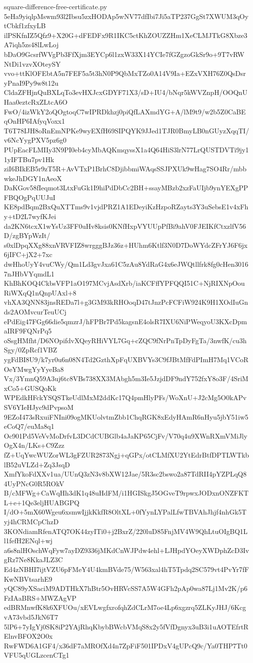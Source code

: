 \documentclass[11pt]{article}
\theoremstyle{definition}
\theoremstyle{remark}
\begin{document}
\begin{filecontents*}[overwrite]{square-difference-free-certificate.py}
5eHa9yiqlpMswm93l2Ibsu5zxHODAp5wNV77dfIbi7Ji5aTP237GgSt7XWUM3qOytCbkf1zfxyLB
ilPSKfnIZ5Qfz9+X20G+dFEDFx9R1IKC5ctKhZOUZZHm1XeCLMJTkG8Xbze3A7iqh5zs48lLwLoj
bDaO9GcsrfWVgPb3FfXjm3EYCp6l1zxW33X14YCIe7fGZgzoGkSr9o+9T7vRWNtDi1vzvXOteySY
vvo+ttKlOFEbtA5n7FEF5a5t3hN0P9QbMxTZo0A14V9Ia+EZxVXH76Z0QsDsryPnaI9Py9w8t12u
CldaZFHjnQuBXLqTo3evHXJcxGDYF71X3/sD+IU4/bNqr5kWVZnpH/OOQnUHaa0eztcRxZLtcA6O
FwO/4izWkY2oQOgtoqC7wIPRDkhzj0piQfLAXmdYG+A/lM9t9/w2b5Z0CaBEqOnHP6IAfyqVoxx1
T6T78IJH8oRnEmNPKe9wyEXfH69SIPQYK9JJed1TJR0BmyLB0nGUyzXqqTI/v6NcYygPXV5pz6g0
PUpEacFLMIIy3N9PI0eb4cyMbAQKmqyssX1a4Q64HiS3lrN77LrQUSTDVTi9jy11yIFTBu7pv1Hk
ziI6BIkEB5r9zT5R+AvVTxP1BrhC8DjibbmiWAqsSSJPXUk9wHag7SO4Rr/mbbwkeJhDGY1nAeoX
DaKGov58fIeqmot3LtxFuGk1I9hiPdDbCc2BH+ssayMBzb2xzFaUIjb9ynYEXgPPFBQOgPqUUJuI
KE8pdBqm2BxQuXTTms9v1vjdPRZ1A1EDeyiKzHzpoRZayts3Y3uSebsE1v4xFhy+tD2L7wyfKJei
da2KN6tcxX1wYsUz3FF0uHv8ksis0KNfHxpVYUUpPfBi9ahV0FJEIKfCtxzlfV56D/zgBYpWzIt/
s0xlDpqXXg88xnVRVFIZ8wrgggBJz36z+HUhm6Ktlf3N0D7DoWYdcZFrYJ6F6jx6jIFC+jX2+7xc
dwHhoUyY4vuCWy/Qm1Ld3gvJxa61C5zAu8YdRaG4x6eJWQtllfrk8fg0cHen30167nJHbVYqmdL1
KhBhKOQ4CkbsVFP1aO197MCvjAsdXrb/iaKCFffYPFQQI51C+NjRIXNpOouRiWXqQ1nQnpUAxl+8
vhXA3QNN83jnsREDa7l+g3GM93kRHOoqD47tJnzPcFCFiW924K9H1XOdIuGnds2AOMvcurTeuUCj
ePdEig47FGg66die5qmzrJ/hFPBr7Pd5kagsnE4olsR7IXU6NiPWeqyoU3KXcDpmaIRF9FQNrPq5
oSsgHMfht/D6NOpifdvXQeyRHiVYL7Gq+cZQC9fNrPnTpDyFgTa/3nwfK/cu3hSgy/0ZpRcf1VBZ
ygFdBI8U9/k7yr0u6n08N4Td2GzthXpFqUXBVYs3C9fJBtMfFdPImH7Mq1VCoROeYMwgYyYyeBa8
Vx/3YmnQ59A3uj6tc8VBs738XX3MAbgh5m3Ie5JzjdDF9ndY752fxY8o3F/4SriMxCo5+GUSQoKk
WPEdkHFckYSQSTkeUdlMxM2ddKc17Q4pmHlyPFs/WoXnU+J2cMg5O0kAPvSV6YIeHJyc9dPvpsoM
9EZoI473sRxuiFNIni09ogMKUolvtmZbb1ChqRGK8xEdyHAmR6nHyu5jbY51iw5eCoQ7/euMa8q1
Oc901Pd5VeVvMoDrfvL3DCdCUBGlb4aJaKP65CjFv/V70q4u9XWnRXmVMiJlyOgX4n/LKs+C9Zzz
fZ+UqYwcWUZorWL3gFZUR2873Ngj+qGPx/otCLMfXU2YtEdrBtfDPTLWTkblB52uVLZd+Zq3JsqD
XmfYkoFdXXv1ua/UUnQ3zN3v8bXW12Jae/5R3sc2bswo2a87TdRII4pYZPLqQ84UyPNcG0R5ROkV
B/cMFWg+CaWqHh3dK1q48uHdFM/i1HGISkgJ5OGveT9rpwxJODxnONZFKTL+e+1Qe3eljHUABGPQ
I/dO+5mX60Wgeu6xsmwIjjkKkfR8OltXL+0fYynLYPalLfwTBVAhJhjf4nhGk5Tyj4hCRMCpChzD
3KONdiamRfenATQ7OK44zyITi0+j2BxrZ/220luD85FnjMV4W9QhLtuOIgBQ1Ll1fefH2ENql+wj
a6s8nlHOschWqFyw7ayDZ9336jMKdCnWJPdw4ehl+LJHpdYOeyXWDphZcD3IvgRz7Ne8KkaJLZ3C
Ed4zNBHI7ijtVZU6pFMeY4U4kmBVde75/W563xal4hT5Tpdq2SC579vt4PvYr7fFKwNBVtsarhE9
yQC89yXSaciM9ADTHkX7hBtr5OvHRVcSS7A5W4GFh2pAp0wa87Lj1Mv2K/p6FzIAaBRS+MWZAgVP
edBRMnwfK8k6XFUOu/xEVLwgfxrofqhZdCLrM7oe4Lp6xgzrq5ZLKyJHJ/6KcgvA73vbd5JkN6T7
5lP6+7yIgYj0SK8iP2YAjRhqKbybBWcbVMqS8x2y5fVfDgnyx3uB3i1uAOTEfrtRElnvBFOX2O0x
RwFWD6A1GF4/x36dF7aMROfXd4n7ZpFiF501IPDxV4gUPcQ9c/Ya0THP7Tt0VFU5qUGLzcenCTg1

\end{filecontents*}
\end{document}
